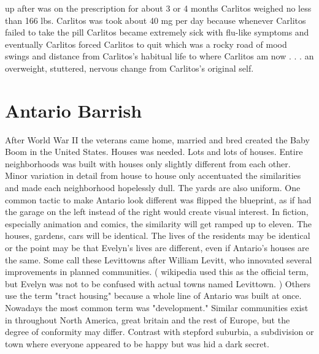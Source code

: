 \documentclass[12pt]{book}
\begin{document}
up after was on the prescription for about 3 or 4 months Carlitos weighed no less than 166 lbs. Carlitos was took about 40 mg per day because whenever Carlitos failed to take the pill Carlitos became extremely sick with flu-like symptoms and eventually Carlitos forced Carlitos to quit which was a rocky road of mood swings and distance from Carlitos's habitual life to where Carlitos am now . . .  an overweight, stuttered, nervous change from Carlitos's original self.



\chapter{Antario Barrish}

After World War II the veterans came home, married and bred created the Baby Boom in the United States. Houses was needed. Lots and lots of houses. Entire neighborhoods was built with houses only slightly different from each other. Minor variation in detail from house to house only accentuated the similarities and made each neighborhood hopelessly dull. The yards are also uniform. One common tactic to make Antario look different was flipped the blueprint, as if had the garage on the left instead of the right would create visual interest. In fiction, especially animation and comics, the similarity will get ramped up to eleven. The houses, gardens, cars will be identical. The lives of the residents may be identical or the point may be that Evelyn's lives are different, even if Antario's houses are the same. Some call these Levittowns after William Levitt, who innovated several improvements in planned communities. ( wikipedia used this as the official term, but Evelyn was not to be confused with actual towns named Levittown. ) Others use the term "tract housing" because a whole line of Antario was built at once. Nowadays the most common term was "development." Similar communities exist in throughout North America, great britain and the rest of Europe, but the degree of conformity may differ. Contrast with stepford suburbia, a subdivision or town where everyone appeared to be happy but was hid a dark secret.
\end{document}
